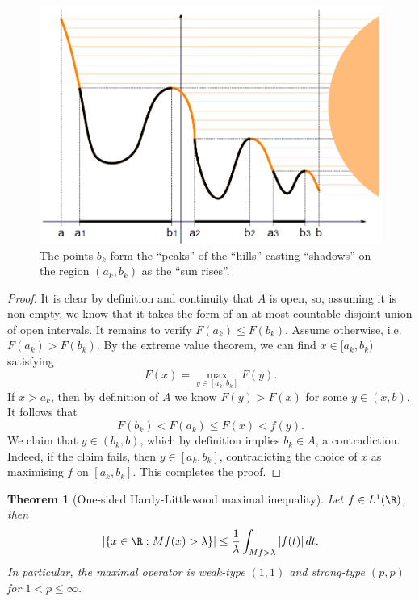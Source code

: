 \documentclass[reqno]{amsart}
\newtheorem{theorem}{Theorem}
\theoremstyle{definition}
\theoremstyle{remark}
\begin{document}
\begin{figure}[h]
	\begin{center}
		\includegraphics[scale = 0.4]{risingsun}
	\end{center}
	\caption{The points $b_k$ form the ``peaks'' of the ``hills'' casting ``shadows'' on the region $(a_k, b_k)$ as the ``sun rises''.}
\end{figure}

\begin{proof}
	It is clear by definition and continuity that $A$ is open, so, assuming it is non-empty, we know that it takes the form of an at most countable disjoint union of open intervals. It remains to verify $F(a_k) \leq F(b_k)$. Assume otherwise, i.e. $F(a_k) >F(b_k)$. By the extreme value theorem, we can find $x \in [a_k, b_k)$ satisfying
		\[ F(x) = \max_{y \in [a_k, b_k]} F(y). \]
	If $x > a_k$, then by definition of $A$ we know $F(y) > F(x)$ for some $y \in (x, b)$. It follows that
		\[ F(b_k) < F(a_k) \leq F(x) < f(y). \]
	We claim that $y \in (b_k, b)$, which by definition implies $b_k \in A$, a contradiction. Indeed, if the claim fails, then $y \in [a_k, b_k]$, contradicting the choice of $x$ as maximising $f$ on $[a_k, b_k]$. This completes the proof. 
\end{proof}

\begin{theorem}[One-sided Hardy-Littlewood maximal inequality]
	Let $f \in L^1 (\R)$, then 
		\[ |\{ x \in \R : Mf (x) > \lambda \}| \leq \frac1\lambda \int_{Mf > \lambda} |f(t)| \, dt. \]	
	In particular, the maximal operator is weak-type $(1, 1)$ and strong-type $(p, p)$ for $1 < p \leq \infty$.	
\end{theorem}
\end{document}
